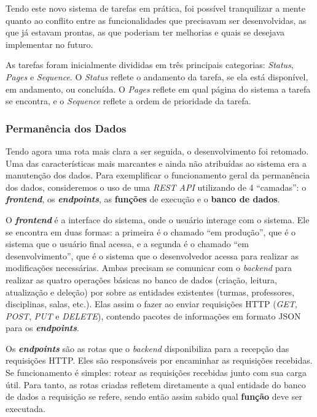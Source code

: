 Tendo este novo sistema de tarefas em prática, foi possível tranquilizar a mente quanto ao conflito entre as funcionalidades que precisavam ser desenvolvidas, as que já estavam prontas, as que poderiam ter melhorias e quais se desejava implementar no futuro.

As tarefas foram inicialmente divididas em três principais categorias: \textit{Status}, \textit{Pages} e \textit{Sequence}. O \textit{Status} reflete o andamento da tarefa, se ela está disponível, em andamento, ou concluída. O \textit{Pages} reflete em qual página do sistema a tarefa se encontra, e o \textit{Sequence} reflete a ordem de prioridade da tarefa.

\subsubsection{Permanência dos Dados}

Tendo agora uma rota mais clara a ser seguida, o desenvolvimento foi retomado. Uma das características mais marcantes e ainda não atribuídas ao sistema era a manutenção dos dados. Para exemplificar o funcionamento geral da permanência dos dados, consideremos o uso de uma \textit{REST API} utilizando de 4 ``camadas'': o \textbf{\textit{frontend}}, os \textbf{\textit{endpoints}}, as \textbf{funções} de execução e o \textbf{banco de dados}.

O \textbf{\textit{frontend}} é a interface do sistema, onde o usuário interage com o sistema. Ele se encontra em duas formas: a primeira é o chamado ``em produção'', que é o sistema que o usuário final acessa, e a segunda é o chamado ``em desenvolvimento'', que é o sistema que o desenvolvedor acessa para realizar as modificações necessárias. Ambas precisam se comunicar com o \textit{backend} para realizar as quatro operações básicas no banco de dados (criação, leitura, atualização e deleção) por sobre as entidades existentes (turmas, professores, disciplinas, salas, etc.). Elas assim o fazer ao enviar requisições HTTP (\textit{GET}, \textit{POST}, \textit{PUT} e \textit{DELETE}), contendo pacotes de informações em formato JSON para os \textbf{\textit{endpoints}}.

Os \textbf{\textit{endpoints}} são as rotas que o \textit{backend} disponibiliza para a recepção das requisições HTTP. Eles são responsáveis por encaminhar as requisições recebidas. Se funcionamento é simples: rotear as requisições recebidas junto com sua carga útil. Para tanto, as rotas criadas refletem diretamente a qual entidade do banco de dados a requisição se refere, sendo então assim sabido qual \textbf{função} deve ser executada.

